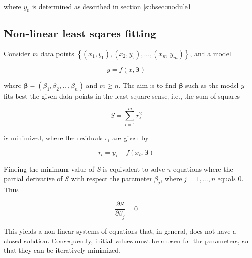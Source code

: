 \documentclass[titlepage,11pt]{article}
\begin{document}
\begin{linenumbers}
		where $ y_0  $ is determined as described in section \ref{subsec:module1}
		\subsection{Non-linear least sqares fitting}\label{subsec:non-linear least squares fitting}
		Consider $ m $ data points $ \left\{(x_1, y_1), (x_2, y_2), ... , (x_m, y_m)\right\} $, and a model
		\begin{linenomath*}
			\begin{equation}
			y = f(x, \boldsymbol{\beta})
			\end{equation}
		\end{linenomath*}
		
		where $ \boldsymbol{\beta} = (\beta_1, \beta_2, ... , \beta_n) $ and $ m \geq n $. The aim is to find $ \boldsymbol{\beta}$ such as the model $ y $ fits best the given data points in the least square sense, i.e., the sum of squares
		\begin{linenomath*}
			\begin{equation}
			S = \sum_{i = 1}^{m} r^2_i
			\end{equation}
		\end{linenomath*}
		
		is minimized, where the residuals $ r_i $ are given by
		\begin{linenomath*}
				\begin{equation}
			r_i = y_i - f(x_i, \boldsymbol{\beta})
			\end{equation}
		\end{linenomath*}
	
		Finding the minimum value of $ S $ is equivalent to solve $ n $ equations where the partial derivative of $ S $ with respect the parameter $ \beta_j $, where $ j = 1, ..., n $ equals 0. Thus
		
		\begin{linenomath*}
			\begin{equation}
			\frac{\partial S}{\partial \beta_j} = 0	
			\end{equation}
		\end{linenomath*}
		This yields a non-linear systems of equations that, in general, does not have a closed solution. Consequently, initial values must be chosen for the parameters, so that they can be iteratively minimized. 

\end{linenumbers}
\end{document}
